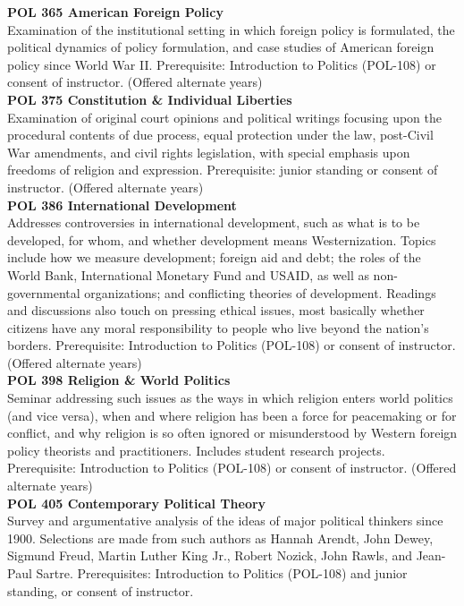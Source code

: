 \documentclass[
  letterpaper,
]{scrbook}
\begin{document}
\textbf{POL 365 American Foreign Policy}\\
Examination of the institutional setting in which foreign policy is
formulated, the political dynamics of policy formulation, and case
studies of American foreign policy since World War II. Prerequisite:
Introduction to Politics (POL-108) or consent of instructor. (Offered
alternate years)\\
\textbf{POL 375 Constitution \& Individual Liberties}\\
Examination of original court opinions and political writings focusing
upon the procedural contents of due process, equal protection under the
law, post-Civil War amendments, and civil rights legislation, with
special emphasis upon freedoms of religion and expression. Prerequisite:
junior standing or consent of instructor. (Offered alternate years)\\
\textbf{POL 386 International Development}\\
Addresses controversies in international development, such as what is to
be developed, for whom, and whether development means Westernization.
Topics include how we measure development; foreign aid and debt; the
roles of the World Bank, International Monetary Fund and USAID, as well
as non-governmental organizations; and conflicting theories of
development. Readings and discussions also touch on pressing ethical
issues, most basically whether citizens have any moral responsibility to
people who live beyond the nation's borders. Prerequisite: Introduction
to Politics (POL-108) or consent of instructor. (Offered alternate
years)\\
\textbf{POL 398 Religion \& World Politics}\\
Seminar addressing such issues as the ways in which religion enters
world politics (and vice versa), when and where religion has been a
force for peacemaking or for conflict, and why religion is so often
ignored or misunderstood by Western foreign policy theorists and
practitioners. Includes student research projects. Prerequisite:
Introduction to Politics (POL-108) or consent of instructor. (Offered
alternate years)\\
\textbf{POL 405 Contemporary Political Theory}\\
Survey and argumentative analysis of the ideas of major political
thinkers since 1900. Selections are made from such authors as Hannah
Arendt, John Dewey, Sigmund Freud, Martin Luther King Jr., Robert
Nozick, John Rawls, and Jean-Paul Sartre. Prerequisites: Introduction to
Politics (POL-108) and junior standing, or consent of instructor.\\
\end{document}
